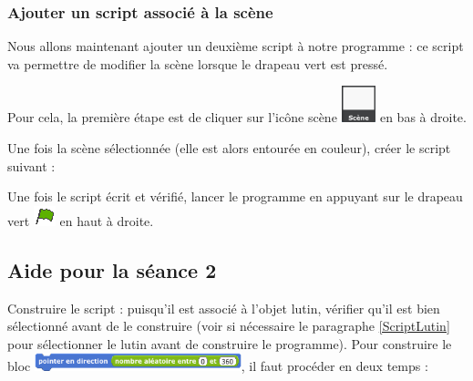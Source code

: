 \subsubsection{Ajouter un script associé à la scène}

Nous allons maintenant ajouter un deuxième script à notre programme : ce script va permettre de modifier la scène lorsque le drapeau vert est pressé. 

Pour cela, la première étape est de cliquer sur l'icône scène \includegraphics[width=1cm]{./images/scratch/Scene} en bas à droite.


Une fois la scène sélectionnée (elle est alors entourée en couleur), créer le script suivant :


Une fois le script écrit et vérifié, lancer le programme en appuyant sur le drapeau vert \includegraphics[width=.7cm]{./images/scratch/DrapeauVert} en haut à droite. 








%
%
%
%









\subsection{Aide pour la séance 2}\label{correction_scratch2}


Construire le script : puisqu'il est associé à l'objet lutin, vérifier qu'il est bien sélectionné avant de le construire (voir si nécessaire le paragraphe \vref{ScriptLutin} pour sélectionner le lutin avant de construire le programme). Pour construire le bloc \includegraphics[width=6cm]{./images/scratch/ScratchActivite23}, il faut procéder en deux temps :

